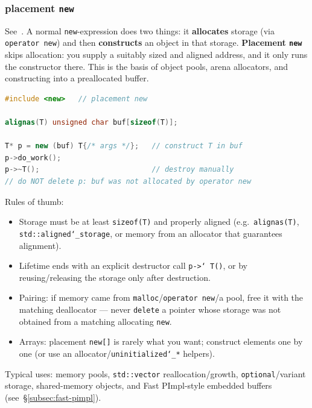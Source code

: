 \subsubsection{placement \texttt{new}}
\label{subsec:placement-new}
See~\cite{cppreference-newexpression}.
\newline
A normal \texttt{new}-expression does two things: it \textbf{allocates} storage 
(via \texttt{operator new}) and then \textbf{constructs} an object in that storage.
\newline
\textbf{Placement \texttt{new}} skips allocation: you supply a suitably sized and 
aligned address, and it only runs the constructor there. This is the basis of 
object pools, arena allocators, and constructing into a preallocated buffer.

\begin{lstlisting}[language=C++]
#include <new>   // placement new

alignas(T) unsigned char buf[sizeof(T)];

T* p = new (buf) T{/* args */};   // construct T in buf
p->do_work();
p->~T();                          // destroy manually
// do NOT delete p: buf was not allocated by operator new
\end{lstlisting}

Rules of thumb:
\begin{itemize}
    \item Storage must be at least \texttt{sizeof(T)} and properly aligned 
          (e.g.\ \texttt{alignas(T)}, \texttt{std::aligned\char`_storage}, or memory 
          from an allocator that guarantees alignment).
    \item Lifetime ends with an explicit destructor call \texttt{p->\char`~T()}, 
          or by reusing/releasing the storage only after destruction.
    \item Pairing: if memory came from \texttt{malloc}/\texttt{operator new}/a pool, 
          free it with the matching deallocator --- never \texttt{delete} a pointer 
          whose storage was not obtained from a matching allocating \texttt{new}.
    \item Arrays: placement \texttt{new[]} is rarely what you want; construct 
          elements one by one (or use an allocator/\texttt{uninitialized\char`_*} 
          helpers).
\end{itemize}

Typical uses: memory pools, \texttt{std::vector} reallocation/growth, 
\texttt{optional}/variant storage, shared-memory objects, and Fast PImpl-style 
embedded buffers (see~\S\ref{subsec:fast-pimpl}).

